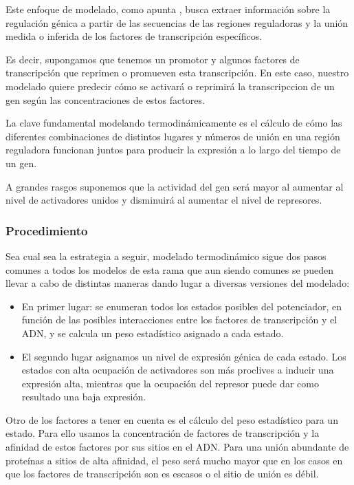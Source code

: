  Este enfoque de modelado, como apunta \cite{ay2011mathematical}, busca extraer información sobre la regulación génica a partir de las secuencias de las regiones reguladoras y la unión medida o inferida de los factores de transcripción específicos.
 
 Es decir, supongamos que tenemos un promotor y algunos factores de transcripción que reprimen o promueven esta transcripción. En este caso, nuestro modelado quiere predecir cómo se activará o reprimirá la transcripccion de un gen según las concentraciones de estos factores.
 
 La clave fundamental modelando termodinámicamente es el cálculo de cómo las diferentes combinaciones de distintos lugares y números de unión en una región reguladora funcionan juntos para producir la expresión a lo largo del tiempo de un gen.
 
 A grandes rasgos suponemos que la actividad del gen será mayor al aumentar al nivel de activadores unidos y disminuirá al aumentar el nivel de represores.
 
 \subsubsection{Procedimiento}
 
  Sea cual sea la estrategia a seguir, modelado termodinámico sigue dos pasos comunes a todos los modelos de esta rama que aun siendo comunes se pueden llevar a cabo de distintas maneras dando lugar a diversas versiones del modelado:
  \begin{itemize}
  	\item En primer lugar: se enumeran todos los estados posibles del potenciador, en función de las posibles interacciones entre los factores de transcripción y el ADN, y se calcula un peso estadístico asignado a cada estado.
  	\item  El segundo lugar asignamos un nivel de expresión génica de cada estado. Los estados con alta ocupación de activadores son más proclives a inducir una expresión alta, mientras que la ocupación del represor puede dar como resultado una baja expresión.
  \end{itemize}

 Otro de los factores a tener en cuenta es el cálculo del peso estadístico para un estado. Para ello usamos la concentración de factores de transcripción y la afinidad de estos factores por sus sitios en el ADN. Para una unión abundante de proteínas a sitios de alta afinidad, el peso será mucho mayor que en los casos en que los factores de transcripción son  es escasos o el sitio de unión es débil.
 
